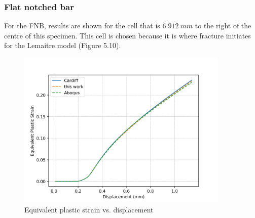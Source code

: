 \documentclass[sn-mathphys,Numbered,draft]{sn-jnl}%
\begin{document}
\subsubsection{Flat notched bar}

For the FNB, results are shown for the cell that is $6.912\ mm$ to the right of the centre of this specimen. This cell is chosen because it is where fracture initiates for the Lemaitre model (Figure 5.10).

\begin{figure}[htb]
\begin{center}
	\includegraphics[width=0.9\textwidth]{./Figures/plasticityCompare/bordenCompare/disp_EpsPEq.png}
\caption{Equivalent plastic strain vs. displacement}
\label{fig:notchedRoundBAr}
\end{center}
\end{figure}
\end{document}
